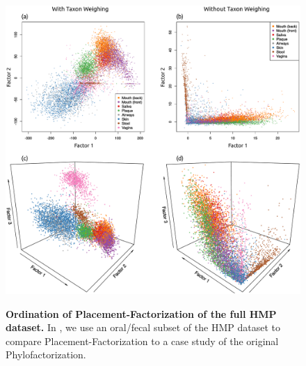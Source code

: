 \begin{figure}[!htb]
    \centering
     \includegraphics[width=\linewidth]{pdf/hmp_pf_all_ordination.pdf}
    \begin{subfigure}{0pt}
        \label{fig:hmp_pf_all_ordination:sub:2d_with_taxon_weighting}
    \end{subfigure}
    \begin{subfigure}{0pt}
        \label{fig:hmp_pf_all_ordination:sub:2d_without_taxon_weighting}
    \end{subfigure}
    \begin{subfigure}{0pt}
        \label{fig:hmp_pf_all_ordination:sub:3d_with_taxon_weighting}
    \end{subfigure}
    \begin{subfigure}{0pt}
        \label{fig:hmp_pf_all_ordination:sub:3d_without_taxon_weighting}
    \end{subfigure}
    \caption[Ordination of Placement-Factorization of the full \ac{HMP} dataset]{
        \textbf{Ordination of Placement-Factorization of the full \ac{HMP} dataset.}
        In ,
        we use an oral/fecal subset of the \ac{HMP} dataset \cite{Huttenhower2012,Methe2012}
        to compare Placement-Factorization to a case study of the original Phylofactorization.
}
\end{figure}
